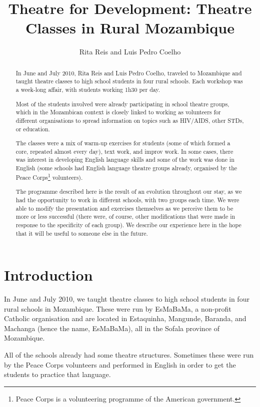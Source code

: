 \documentclass[article,twocolumn,twoside]{memoir}
\title{Theatre for Development: Theatre Classes in Rural Mozambique}
\author{Rita Reis and Luis Pedro Coelho}a
\begin{document}
\maketitle

\begin{abstract}
In June and July 2010, Rita Reis and Luis Pedro Coelho, traveled to Mozambique
and taught theatre classes to high school students in four rural schools. Each
workshop was a week-long affair, with students working 1h30 per day.

Most of the students involved were already participating in school theatre
groups, which in the Mozambican context is closely linked to working as
volunteers for different organisations to spread information on topics such as
HIV/AIDS, other STDs, or education.

The classes were a mix of warm-up exercises for students (some of which formed
a core, repeated almost every day), text work, and improv work. In some cases,
there was interest in developing English language skills and some of the work
was done in English (some schools had English language theatre groups already,
organised by the Peace Corps\footnote{Peace Corps is a volunteering programme
of the American government.} volunteers).

The programme described here is the result of an evolution throughout our stay,
as we had the opportunity to work in different schools, with two groups each
time. We were able to modify the presentation and exercises themselves as we
perceive them to be more or less successful (there were, of course, other
modifications that were made in response to the specificity of each group). We
describe our experience here in the hope that it will be useful to someone else
in the future.

\end{abstract}

\chapter{Introduction}
In June and July 2010, we taught theatre classes to high school students in
four rural schools in Mozambique. These were run by EsMaBaMa, a non-profit
Catholic organisation and are located in Estaquinha, Mangunde, Baranda, and
Machanga (hence the name, EsMaBaMa), all in the Sofala province of Mozambique.

All of the schools already had some theatre structures. Sometimes these were
run by the Peace Corps volunteers and performed in English in order to get the
students to practice that language.
\end{document}
